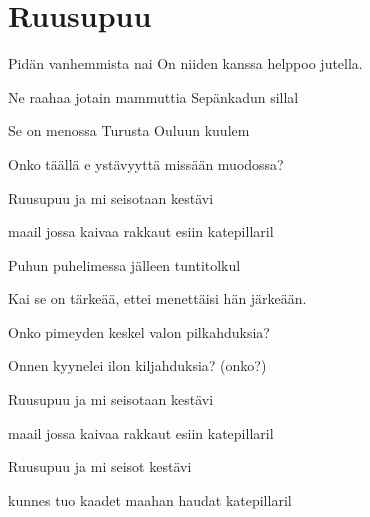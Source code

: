 \documentclass[12pt,a4paper]{article}
\begin{document}
\thispagestyle{empty}
\section*{Ruusupuu}


\begin{SBVerse}
Pidän vanhemmista nai On niiden kanssa helppoo
jutella.

Ne raahaa jotain mammuttia Sepänkadun
sillal

Se on menossa Turusta Ouluun kuulem

Onko täällä e ystävyyttä missään muodossa?
\end{SBVerse}

\begin{SBChorus}
Ruusupuu ja mi 
seisotaan kestävi 

maail jossa kaivaa 
rakkaut esiin 
katepillaril
\end{SBChorus}

\begin{SBVerse*}
  
\end{SBVerse*}

\begin{SBVerse}
Puhun puhelimessa jälleen tuntitolkul

Kai se on tärkeää, ettei menettäisi hän
järkeään.

Onko pimeyden keskel valon pilkahduksia?

Onnen kyynelei ilon kiljahduksia? (onko?)
\end{SBVerse}

\begin{SBChorus}
Ruusupuu ja mi 
seisotaan kestävi 

maail jossa kaivaa 
rakkaut esiin  katepillaril

Ruusupuu ja mi 
seisot kestävi 

kunnes  tuo kaadet 
maahan haudat
katepillaril
\end{SBChorus}

\begin{SBVerse*}
    
       
  
\end{SBVerse*}

\end{document}
